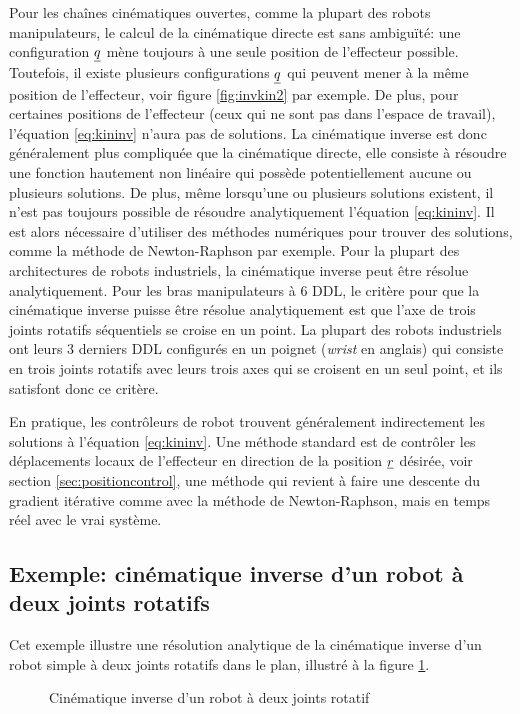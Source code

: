 Pour les chaînes cinématiques ouvertes, comme la plupart des robots manipulateurs, le calcul de la cinématique directe est sans ambiguïté: une configuration $\underline{q}$ mène toujours à une seule position de l'effecteur possible. Toutefois, il existe plusieurs configurations $\underline{q}$ qui peuvent mener à la même position de l'effecteur, voir figure \ref{fig:invkin2} par exemple. De plus, pour certaines positions de l'effecteur (ceux qui ne sont pas dans l'espace de travail), l'équation \eqref{eq:kininv} n'aura pas de solutions. La cinématique inverse est donc généralement plus compliquée que la cinématique directe, elle consiste à résoudre une fonction hautement non linéaire qui possède potentiellement aucune ou plusieurs solutions. De plus, même lorsqu'une ou plusieurs solutions existent, il n'est pas toujours possible de résoudre analytiquement l'équation \eqref{eq:kininv}. Il est alors nécessaire d'utiliser des méthodes numériques pour trouver des solutions, comme la méthode de Newton-Raphson par exemple. Pour la plupart des architectures de robots industriels, la cinématique inverse peut être résolue analytiquement. Pour les bras manipulateurs à 6 DDL, le critère pour que la cinématique inverse puisse être résolue analytiquement est que l'axe de trois joints rotatifs séquentiels se croise en un point. La plupart des robots industriels ont leurs 3 derniers DDL configurés en un poignet (\textit{wrist} en anglais) qui consiste en trois joints rotatifs avec leurs trois axes qui se croisent en un seul point, et ils satisfont donc ce critère.

En pratique, les contrôleurs de robot trouvent généralement indirectement les solutions à l'équation \eqref{eq:kininv}. Une méthode standard est de contrôler les déplacements locaux de l'effecteur en direction de la position $\underline{r}$ désirée, voir section \ref{sec:positioncontrol}, une méthode qui revient à faire une descente du gradient itérative comme avec la méthode de Newton-Raphson, mais en temps réel avec le vrai système.


\subsection{Exemple: cinématique inverse d'un robot à deux joints rotatifs}

Cet exemple illustre une résolution analytique de la cinématique inverse d'un robot simple à deux joints rotatifs dans le plan, illustré à la figure \ref{fig:invkin}.

\begin{figure}[htbp]
	\centering
	\hspace{10pt}
	\caption{Cinématique inverse d'un robot à deux joints rotatif }
	\label{fig:invkin}
\end{figure}

